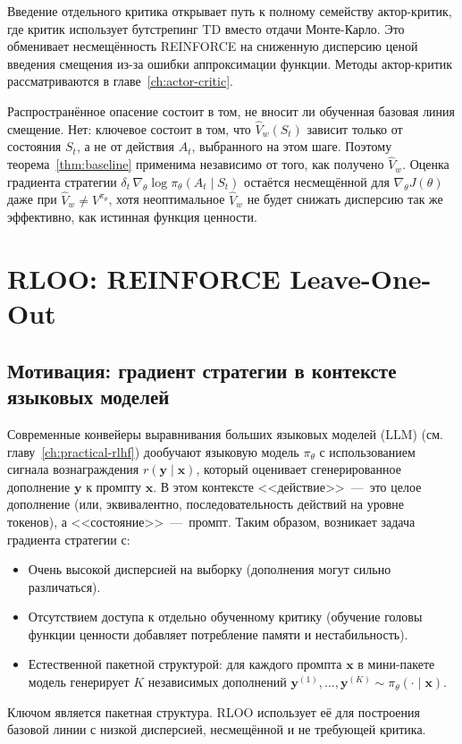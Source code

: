 \begin{remark}
Введение отдельного критика открывает путь к полному семейству актор-критик, где критик использует бутстрепинг TD вместо отдачи Монте-Карло. Это обменивает несмещённость REINFORCE на сниженную дисперсию ценой введения смещения из-за ошибки аппроксимации функции. Методы актор-критик рассматриваются в главе~\ref{ch:actor-critic}.
\end{remark}

Распространённое опасение состоит в том, не вносит ли обученная базовая линия смещение. Нет: ключевое состоит в том, что $\hat V_w(S_t)$ зависит только от состояния $S_t$, а не от действия $A_t$, выбранного на этом шаге. Поэтому теорема~\ref{thm:baseline} применима независимо от того, как получено $\hat V_w$. Оценка градиента стратегии $\delta_t\, \nabla_\theta \log \pi_\theta(A_t \mid S_t)$ остаётся несмещённой для $\nabla_\theta J(\theta)$ даже при $\hat V_w \neq V^{\pi_\theta}$, хотя неоптимальное $\hat V_w$ не будет снижать дисперсию так же эффективно, как истинная функция ценности.

\section{RLOO: REINFORCE Leave-One-Out}
\label{sec:rloo}


\subsection{Мотивация: градиент стратегии в контексте языковых моделей}

Современные конвейеры выравнивания больших языковых моделей (LLM) (см. главу~\ref{ch:practical-rlhf}) дообучают языковую модель $\pi_\theta$ с использованием сигнала вознаграждения $r(\mathbf{y} \mid \mathbf{x})$, который оценивает сгенерированное дополнение $\mathbf{y}$ к промпту $\mathbf{x}$. В этом контексте <<действие>> \,---\, это целое дополнение (или, эквивалентно, последовательность действий на уровне токенов), а <<состояние>> \,---\, промпт. Таким образом, возникает задача градиента стратегии с:
\begin{itemize}[leftmargin=*]
\item Очень высокой дисперсией на выборку (дополнения могут сильно различаться).
\item Отсутствием доступа к отдельно обученному критику (обучение головы функции ценности добавляет потребление памяти и нестабильность).
\item Естественной пакетной структурой: для каждого промпта $\mathbf{x}$ в мини-пакете модель генерирует $K$ независимых дополнений $\mathbf{y}^{(1)}, \ldots, \mathbf{y}^{(K)} \sim \pi_\theta(\cdot \mid \mathbf{x})$.
\end{itemize}
Ключом является пакетная структура. RLOO использует её для построения базовой линии с низкой дисперсией, несмещённой и не требующей критика.

